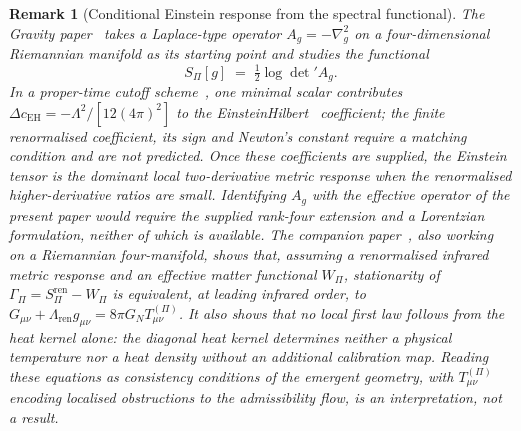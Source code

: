\documentclass[11pt,a4paper]{article}
\newtheorem{remark}[theorem]{Remark}
\begin{document}
  \begin{remark}[Conditional Einstein response from the spectral functional]
    \label{rem:einstein}
    The Gravity paper~\cite{Beau2026h} takes a Laplace-type operator $A_g = -\nabla_g^2$ on a four-dimensional
    Riemannian manifold as its starting point and studies the functional
    \begin{equation}
      S_\Pi[g] \;=\; \tfrac{1}{2}\log\det{}' A_g .
    \end{equation}
    In a proper-time cutoff scheme~\cite{Schwinger1951}, one minimal scalar contributes $\Delta c_{\mathrm{EH}} =
    -\Lambda^2/[12(4\pi)^2]$ to the Einstein\textendash Hilbert~\cite{Einstein1915,Hilbert1915} coefficient; the finite
    renormalised coefficient, its sign and Newton's constant require a matching condition and are not predicted.
    Once these coefficients are supplied, the Einstein tensor is the dominant local two-derivative metric response
    when the renormalised higher-derivative ratios are small.
    Identifying $A_g$ with the effective operator of the present paper would require the supplied rank-four extension
    and a Lorentzian formulation, neither of which is available.
    The companion paper~\cite{Beau2026Thermodynamics}, also working on a Riemannian four-manifold, shows that, assuming
    a renormalised infrared metric response and
    an effective matter functional $W_\Pi$, stationarity of $\Gamma_\Pi = S_\Pi^{\mathrm{ren}} - W_\Pi$ is equivalent,
    at leading infrared order, to $G_{\mu\nu} + \Lambda_{\mathrm{ren}} g_{\mu\nu} = 8\pi G_N T^{(\Pi)}_{\mu\nu}$.
    It also shows that no local first law follows from the heat kernel alone: the diagonal heat kernel determines
    neither a physical temperature nor a heat density without an additional calibration map.
    Reading these equations as consistency conditions of the emergent geometry, with $T^{(\Pi)}_{\mu\nu}$ encoding
    localised obstructions to the admissibility flow, is an interpretation, not a result.
  \end{remark}
\end{document}
